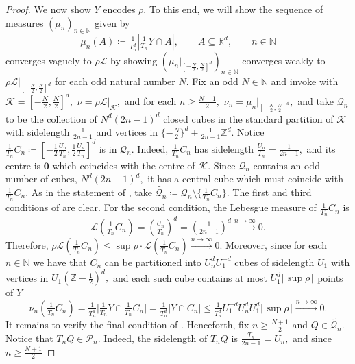 \documentclass{article}
\newcommand{\R}{\mathbb{R}}
\newcommand{\Z}{\mathbb{Z}}
\newcommand{\N}{\mathbb{N}}
\newcommand{\leb}{\mc{L}}
\newcommand{\mc}[1]{\mathcal{#1}}
\begin{document}
\begin{proof}
   We now show $Y$ encodes $\rho.$
To this end, we will show the sequence of measures $(\mu_n)_{n \in \N}$ given by $$\mu_n(A) \coloneqq \tfrac{1}{T_n^d}|\tfrac{1}{T_n}Y \cap A|, \qquad A \subseteq \R^d, \qquad n \in \N$$  converges vaguely to $\rho \leb$ by showing $(\mu_n|_{[-\frac{N}{2},\frac{N}{2}]^d})_{n \in \N}$ converges weakly to $\rho\leb|_{[-\frac{N}{2},\frac{N}{2}]^d}$ for each odd natural number $N$. Fix an odd $N \in \N$ and invoke \cite[Proposition $4.1$]{bhat2025fast} with $\mathcal{K} = [-\frac{N}{2},\frac{N}{2}]^d,$  $\nu = \rho\leb|_{\mathcal{K}},$ and for each $n \geq \frac{N+1}{2},$ $\nu_n = \mu_n|_{[-\frac{N}{2},\frac{N}{2}]^d},$ and take $\mathcal{Q}_n$ to be the collection of $N^d(2n-1)^d$ closed cubes in the standard partition of $\mathcal{K}$ with sidelength $\frac{1}{2n-1}$ and vertices in $\{-\frac{N}{2}\}^d + \frac{1}{2n-1}\Z^d.$ 
Notice $\tfrac{1}{T_n}C_n \coloneqq  [-\frac{1}{2}\frac{U_n}{T_n}, \frac{1}{2}\frac{U_n}{T_n}]^d$ is in $\mathcal{Q}_n.$ Indeed, $\tfrac{1}{T_n}C_n$ has sidelength $\frac{U_{n}}{T_n} = \frac{1}{2n-1},$ and its centre is $\textbf{0}$ which coincides with the centre of $\mathcal{K}.$ Since $\mathcal{Q}_n$ contains an odd number of cubes, $N^d(2n-1)^d,$ it has a central cube which must coincide with $\tfrac{1}{T_n}C_n.$
As in the statement of \cite[Proposition $4.1$]{bhat2025fast}, take $\widetilde{\mathcal{Q}_n} \coloneqq \mathcal{Q}_n \setminus \{\tfrac{1}{T_n}C_n\}.$ The first and third conditions of \cite[Proposition $4.1$]{bhat2025fast} are clear. For the second condition, the Lebesgue measure of $\tfrac{1}{T_n}C_n$ is
\begin{equation*}
    \leb\left(\tfrac{1}{T_n}C_n\right) = \left(\tfrac{U_{n}}{T_n}\right)^d =  \left(\tfrac{1}{2n-1}\right)^d \xrightarrow{n \to \infty} 0 .
\end{equation*}Therefore, $\rho\leb(\tfrac{1}{T_n}C_n) \leq \sup \rho\cdot \leb(\tfrac{1}{T_n}C_n) \xrightarrow{n \to \infty} 0.$ Moreover, since for each $n \in \N$ we have that $C_n$ can be partitioned into $U_n^dU_1^{-d}$ cubes of sidelength $U_1$ with vertices in $U_1(\Z-\frac{1}{2})^d,$ and each such cube contains at most $U_1^d\lceil\sup \rho\rceil$ points of $Y$
\begin{equation} \label{eq: mun bounded}
    \nu_n\left(\tfrac{1}{T_n}C_n\right) = \tfrac{1}{T_n^d}\bigg|\tfrac{1}{T_n}Y \cap \tfrac{1}{T_n}C_n\bigg|= \tfrac{1}{T_n^d}|Y \cap C_n| \leq \tfrac{1}{T_n^d} U_1^{-d}{U_n^d}U_1^d\lceil\sup \rho\rceil \xrightarrow{n \to \infty} 0.
\end{equation}
It remains to verify the final condition of \cite[Proposition $4.1$]{bhat2025fast}. Henceforth, fix $n \geq \frac{N+1}{2}$ and $Q \in \widetilde{\mathcal{Q}_n}$. Notice that $T_nQ \in \mathcal{P}_n.$ Indeed, the sidelength of $T_nQ$ is $\frac{T_n}{2n-1} = U_n,$ and since $n \geq \frac{N+1}{2}$

\end{proof}
\end{document}
